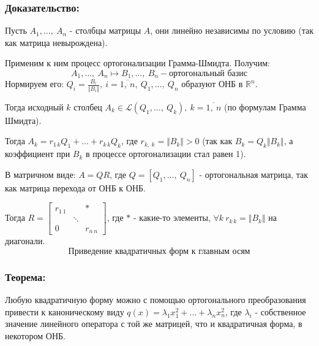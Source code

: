 \documentclass[12pt, letterpaper, twoside]{article}
\newcommand{\mb}[1]{\mathbb{#1}}
\begin{document}
    \subsubsection*{Доказательство:}
    Пусть $A_1,\dots,\ A_n$ - столбцы матрицы $A$, они линейно независимы по условию (так как матрица невырождена).\par
    Применим к ним процесс ортогонализации Грамма-Шмидта. Получим:
    \[A_1,\dots,\ A_n \longmapsto B_1,\dots,\ B_n - \text{ортогональный базис}\]
    Нормируем его: $Q_i = \frac{B_i}{\Vert B_i \Vert},\ i = \overline{1,\ n},\ Q_1,\dots,\ Q_n$ образуют ОНБ в $\mb{R}^n$.\par
    Тогда исходный $k$ столбец $A_k \in \mathcal{L}(Q_1,\dots,\ Q_k),\ k = \overline{1,\ n}$ (по формулам Грамма Шмидта).\par
    Тогда $A_k = r_{1\, k} Q_1 + \dots + r_{k\, k}Q_k$, где $r_{k,\ k} = \Vert B_k \Vert > 0$ (так как $B_k = Q_k \Vert B_k \Vert$, а коэффициент при $B_k$ в процессе ортогонализации стал равен 1).\par
    В матричном виде: $A = QR$, где $Q = [Q_1,\dots,\ Q_n]$ - ортогональная матрица, так как матрица перехода от ОНБ к ОНБ.\par
    Тогда $R = \left[ \begin{matrix}
        r_{1\, 1} &       & *\\
            &\ddots &  \\
        0   &       & r_{n\, n}
    \end{matrix} \right]$, где $*$ - какие-то элементы, $\forall k\ r_{k\, k} = \Vert B_k \Vert$ на диагонали.
    \newpage
    \[\text{Приведение квадратичных форм к главным осям}\]
    
    \subsubsection*{Теорема:}
    Любую квадратичную форму можно с помощью ортогонального преобразования привести к каноническому виду $q(x) = \lambda_1 x_1^2 + \dots + \lambda_n x_n^2$, где $\lambda_i$ - собственное значение линейного оператора с той же матрицей, что и квадратичная форма, в некотором ОНБ. 
\end{document}
